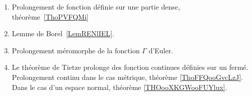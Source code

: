
\begin{enumerate}
	\item Prolongement de fonction définie sur une partie dense, théorème~\ref{ThoPVFQMi}
	\item Lemme de Borel~\ref{LemRENlIEL}.
	\item Prolongement méromorphe de la fonction \( \Gamma\) d'Euler.
    \item Le théorème de Tietze prolonge des fonction continues définies sur un fermé. Prolongement continu dans le cas métrique, théorème \ref{ThoFFQooGvcLzJ}. Dans le cas d'un espace normal, théorème \ref{THOooXKGWooFUYlux}.
\end{enumerate}
